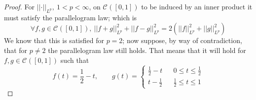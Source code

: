 \documentclass{article}
\newcommand{\norm}[1]{\left|\left|#1\right|\right|}
\newcommand{\parens}[1]{\left(#1\right)}
\newcommand{\cont}[3]{\mathcal{C}_{#1}^{#2}\parens{#3}}
\begin{document}
    \begin{proof}
    For $\norm{\cdot}_{L^p},\ 1 < p < \infty$, on $\cont{}{}{[0,1]}$ to be induced by an inner
    product it must satisfy the parallelogram law; which is 
    $$\forall f,g \in \cont{}{}{[0,1]},\ \norm{f+g}_{L^p}^2 + \norm{f-g}_{L^p}^2 = 
    2\parens{\norm{f}_{L^p}^2 + \norm{g}_{L^p}^2}$$
    We know that this is satisfied for $p = 2$; now suppose, by way of contradiction, 
    that for $p \neq 2$ the parallelogram law still holds. That means that it will
    hold for $f, g \in \cont{}{}{[0,1]}$ such that  
    $$f(t) = \frac{1}{2} - t, \qquad g(t) = \left\{\begin{array}{lcr}
    \frac{1}{2} - t & & 0 \leq t \leq \frac{1}{2} \\
    t - \frac{1}{2} & & \frac{1}{2} \leq t \leq 1    
    \end{array}\right.$$


\end{proof}
\end{document}
